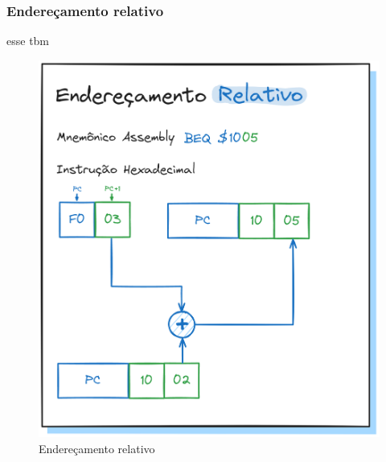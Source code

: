\documentclass[
	12pt,				  %
	openright,		%
	a4paper,			%
	english,			%
	french,				%
	spanish,			%
	brazil,				%
]{abntex2}
\begin{document}
\subsubsection{Endereçamento relativo}
esse tbm
\begin{figure}[H]
	\centering
	\caption{Endereçamento relativo} \label{fig:address:rel}
	\includegraphics[scale=0.25]{../assets/img/addressing-modes-rel.png}
\end{figure}
\end{document}
